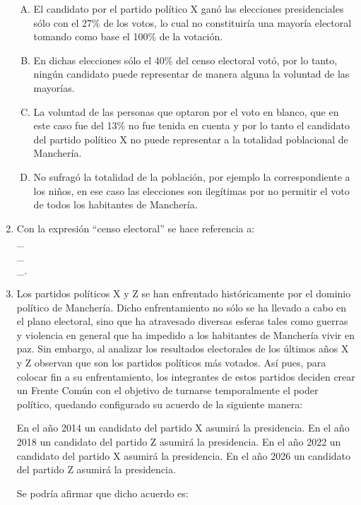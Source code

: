 \begin{enumerate}
\begin{enumerate}[(A)]
\item El candidato por el partido político X ganó las elecciones presidenciales sólo con el 27\% de los votos, lo cual no constituiría una mayoría electoral tomando como base el 100\% de la votación.
\item En dichas elecciones sólo el 40\% del censo electoral votó, por lo tanto, ningún candidato puede representar de manera alguna la voluntad de las mayorías.   
\item La voluntad de las personas que optaron por el voto en blanco, que en este caso fue del 13\% no fue tenida en cuenta y por lo tanto el candidato del partido político X no puede representar a la totalidad poblacional de Manchería.
\item No sufragó la totalidad de la población, por ejemplo la correspondiente a los niños, en ese caso las elecciones son ilegítimas por no permitir el voto de todos los habitantes de Manchería.

\end{enumerate}

\item Con la expresión ``censo electoral'' se hace referencia a:\label{socandres-23}\hrulefill\\
\_\hrulefill\\
\_\hrulefill\\
\_\hrulefill.

\item Los partidos políticos X y Z se han enfrentado históricamente por el dominio político de Manchería. Dicho enfrentamiento no sólo se ha llevado a cabo en el plano electoral, sino que ha atravesado diversas esferas tales como guerras y violencia en general que ha impedido a los habitantes de Manchería vivir en paz. Sin embargo, al analizar los resultados electorales de los últimos años X y Z observan que son los partidos políticos más votados. Así pues, para colocar fin a su enfrentamiento, los integrantes de estos partidos deciden crear un Frente Común con el objetivo de turnarse temporalmente el poder político, quedando configurado su acuerdo de la siguiente manera:\label{socandres-24}

En el año 2014 un candidato del partido X asumirá la presidencia.
En el año 2018 un candidato del partido Z asumirá la presidencia.
En el año 2022 un candidato del partido X asumirá la presidencia.
En el año 2026 un candidato del partido Z asumirá la presidencia.

Se podría afirmar que dicho acuerdo es:


\end{enumerate}
